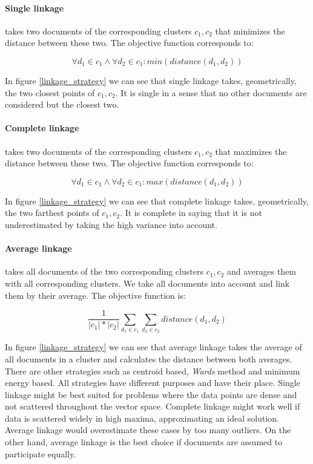     \paragraph{Single linkage} takes two documents of the corresponding clusters $c_1,c_2$ that minimizes the distance between these two. The objective function corresponds to:
      
      \begin{equation}
        \forall d_1 \in c_1 \wedge \forall d_2 \in c_1: min(distance(d_1, d_2))
      \end{equation}

    In figure \ref{linkage_strategy} we can see that single linkage takes, geometrically, the two closest points of $c_1,c_2$. It is single in a sense that no other documents are considered but the closest two.

    \paragraph{Complete linkage} takes two documents of the corresponding clusters $c_1,c_2$ that maximizes the distance between these two. The objective function corresponds to:
      
      \begin{equation}
        \forall d_1 \in c_1 \wedge \forall d_2 \in c_1: max(distance(d_1, d_2))
      \end{equation}

    In figure \ref{linkage_strategy} we can see that complete linkage takes, geometrically, the two farthest points of $c_1,c_2$. It is complete in saying that it is not underestimated by taking the high variance into account.

    \paragraph{Average linkage} takes all documents of the two corresponding clusters $c_1,c_2$ and averages them with all corresponding clusters. We take all documents into account and link them by their average. The objective function is:

      \begin{equation}
        \frac{1}{|c_1|*|c_2|} \sum_{d_1 \in c_1} \sum_{d_2 \in c_2} distance(d_1, d_2)
      \end{equation}

    In figure \ref{linkage_strategy} we can see that average linkage takes the average of all documents in a cluster and calculates the distance between both averages. There are other strategies such as centroid based, \emph{Wards} method and minimum energy based.
    All strategies have different purposes and have their place. Single linkage might be best suited for problems where the data points are dense and not scattered throughout the vector space. Complete linkage might work well if data is scattered widely in high maxima, approximating an ideal solution. Average linkage would overestimate these cases by too many outliers. On the other hand, average linkage is the best choice if documents are assumed to  participate equally. 


